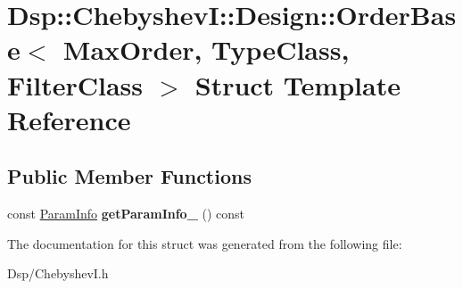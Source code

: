 \hypertarget{structDsp_1_1ChebyshevI_1_1Design_1_1OrderBase}{\section{Dsp\-:\-:Chebyshev\-I\-:\-:Design\-:\-:Order\-Base$<$ Max\-Order, Type\-Class, Filter\-Class $>$ Struct Template Reference}
\label{structDsp_1_1ChebyshevI_1_1Design_1_1OrderBase}
}
\subsection*{Public Member Functions}
\begin{DoxyCompactItemize}
\item 
\hypertarget{structDsp_1_1ChebyshevI_1_1Design_1_1OrderBase_a002cca8168443867db8dbd6ef2d12b63}{const \hyperlink{classDsp_1_1ParamInfo}{Param\-Info} {\bfseries get\-Param\-Info\-\_} () const }\label{structDsp_1_1ChebyshevI_1_1Design_1_1OrderBase_a002cca8168443867db8dbd6ef2d12b63}

\end{DoxyCompactItemize}


The documentation for this struct was generated from the following file\-:\begin{DoxyCompactItemize}
\item 
Dsp/Chebyshev\-I.\-h\end{DoxyCompactItemize}
